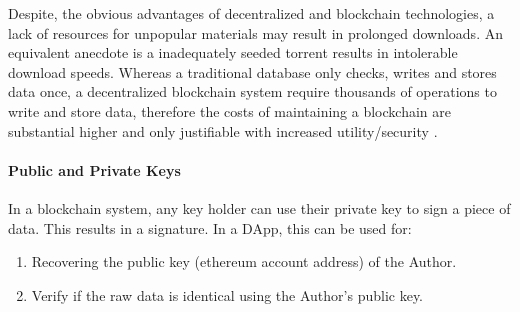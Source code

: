 	
	Despite, the obvious advantages of decentralized and \gls{blockchain} technologies,  a lack of resources for unpopular materials may result in prolonged downloads. An equivalent anecdote is a inadequately seeded torrent results in intolerable download speeds.  Whereas a traditional database only checks, writes and stores data once, a decentralized blockchain system require thousands of operations to write and store data, therefore the costs of maintaining a \gls{blockchain} are substantial higher and only justifiable with increased utility/security \cite{EthScale:Online}. 
	
	
	\paragraph{Public and Private Keys}
	 In a \gls{blockchain} system, any key holder can use their private key to sign a piece of data. This results in a signature.  
	  In a \gls{DApp}, this can be used for:
	 \begin{enumerate}
		\item Recovering the public key (ethereum account address) of the Author.
		\item Verify if the raw data is identical  using the Author's public key. 
	\end{enumerate}
	
